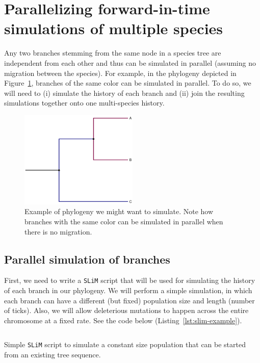 \documentclass[12pt]{article}
\newcommand{\slim}[0]{\texttt{SLiM}\xspace}
\begin{document}
\section*{Parallelizing forward-in-time simulations of multiple species}

Any two branches stemming from the same node in a species tree are independent from each other and
thus can be simulated in parallel (assuming no migration between the species).
For example, in the phylogeny depicted in Figure~\ref{fig:phylo},
branches of the same color can be simulated in parallel.
To do so, we will need to
(i) simulate the history of each branch and
(ii) join the resulting simulations together onto one multi-species history.

 \begin{figure}[h!]
 \centering
  \includegraphics[width=0.5\textwidth]{./code/parallelizing_phylogeny/phylo.pdf}
  \caption{Example of phylogeny we might want to simulate. Note how branches with the same color can be simulated in parallel when there is no migration.}
  \label{fig:phylo}
 \end{figure}

\subsection{Parallel simulation of branches}

First, we need to write a \slim script that will be used for simulating the history of each branch in our phylogeny.
We will perform a simple simulation,
in which each branch can have a different (but fixed) population size and length (number of ticks).
Also, we will allow deleterious mutations to happen across the entire chromosome at a fixed rate.
See the code below (Listing~\ref{lst:slim-example}).

\begin{listing}[H]
  \inputminted[fontsize=\small, linenos, bgcolor=gray!10]{javascript}{./code/parallelizing_phylogeny/simulate_branch.slim}
  \caption{Simple \slim script to simulate a constant size population that can be started from an existing tree sequence.}
  \label{lst:slim-example}
\end{listing}
\end{document}
